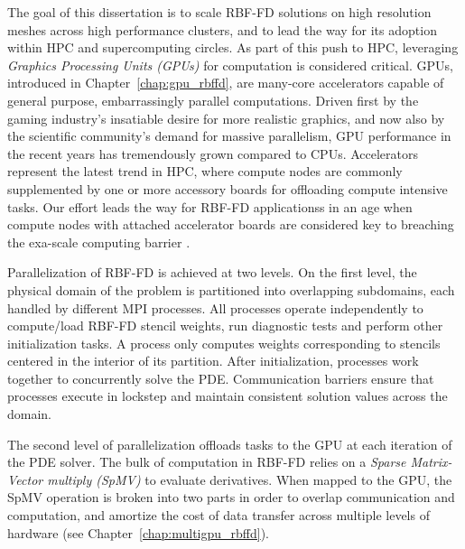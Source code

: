 \documentclass[11pt]{report}
\begin{document}
The goal of this dissertation is to scale RBF-FD solutions on high resolution meshes across high performance clusters, and to lead the way for its adoption within HPC and supercomputing circles. As part of this push to HPC, leveraging \emph{Graphics Processing Units (GPUs)} for computation is considered critical. GPUs, introduced in Chapter~\ref{chap:gpu_rbffd}, are many-core accelerators capable of general purpose, embarrassingly parallel computations. Driven first by the gaming industry's insatiable desire for more realistic graphics, and now also by the scientific community's demand for massive parallelism, GPU performance in the recent years has 
tremendously grown compared to CPUs. Accelerators represent the latest trend in HPC, where compute nodes are commonly supplemented by one or more accessory boards for offloading compute intensive tasks. Our effort leads the way for RBF-FD applicationss in an age when compute nodes with attached accelerator boards are considered key to breaching the exa-scale computing barrier \cite{GPUandExascale2011}. 



Parallelization of RBF-FD is achieved at two levels. On the first level, the
physical domain of the problem is partitioned
into overlapping subdomains, each handled by different MPI processes. All processes
operate independently to compute/load RBF-FD stencil weights, run diagnostic
tests and perform other initialization tasks. A process only computes weights
corresponding to stencils centered in the interior of its partition. After
initialization, processes work together to concurrently solve the PDE. Communication
barriers ensure that processes execute in lockstep and maintain consistent
solution values across the domain.  

The second level of
parallelization offloads tasks to the GPU at each iteration of the PDE solver. The bulk of computation in RBF-FD relies on a \emph{Sparse Matrix-Vector multiply (SpMV)} to evaluate derivatives. When mapped to the GPU, the SpMV operation is broken into two parts in order to overlap communication and computation, and amortize the cost of data transfer across multiple levels of hardware (see Chapter~\ref{chap:multigpu_rbffd}). 
\end{document}
